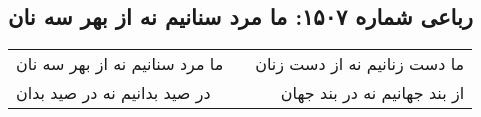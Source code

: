 \begin{center}
\section*{رباعی شماره ۱۵۰۷: ما مرد سنانیم نه از بهر سه نان}
\label{sec:1507}
\begin{longtable}{l p{0.5cm} r}
ما مرد سنانیم نه از بهر سه نان
&&
ما دست زنانیم نه از دست زنان
\\
در صید بدانیم نه در صید بدان
&&
از بند جهانیم نه در بند جهان
\\
\end{longtable}
\end{center}
